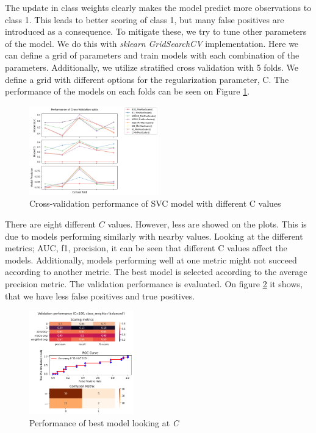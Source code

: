 The update in class weights clearly makes the model predict more observations to class 1. This leads to better scoring of class 1, but many false positives are introduced as a consequence. To mitigate these, we try to tune other parameters of the model. We do this with \textit{sklearn} \textit{GridSearchCV} implementation. Here we can define a grid of parameters and train models with each combination of the parameters. Additionally, we utilize stratified cross validation with 5 folds. We define a grid with different options for the regularization parameter, C. The performance of the models on each folds can be seen on Figure \ref{fig:results_gridcv_balanced_C}.     

\begin{figure}
  \centering
  \includegraphics[width=0.5\textwidth]{../project/images/results_gridcv_balanced-C.png}
  \caption{Cross-validation performance of SVC model with different C values}
  \label{fig:results_gridcv_balanced_C}
\end{figure}
There are eight different $C$ values. However, less are showed on the plots. This is due to models performing similarly with nearby values. Looking at the different metrics; AUC, f1, precision, it can be seen that different C values affect the models. Additionally, models performing well at one metric might not succeed according to another metric. The best model is selected according to the average precision metric. The validation performance is evaluated. On figure \ref{fig:results_gridcv_balanced_C_metrics} it shows, that we have less false positives and true positives.   
\begin{figure}[]
  \centering
  \includegraphics[width=0.4\textwidth]{../project/images/results_gridcv_balanced-C_metrics.png}
  \caption{Performance of best model looking at \textit{C}}
  \label{fig:results_gridcv_balanced_C_metrics}
\end{figure}

